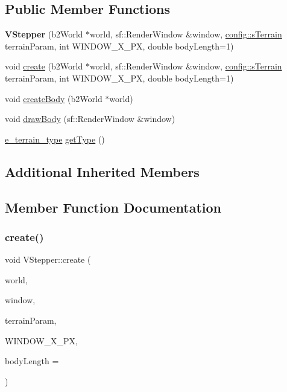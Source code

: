 \subsection*{Public Member Functions}
\begin{DoxyCompactItemize}
\item 
\mbox{\label{class_v_stepper_ab286d507c806c6e9fbac5ca38d47c443}} 
{\bfseries V\+Stepper} (b2\+World $\ast$world, sf\+::\+Render\+Window \&window, \mbox{\hyperlink{structconfig_1_1s_terrain}{config\+::s\+Terrain}} terrain\+Param, int W\+I\+N\+D\+O\+W\+\_\+\+X\+\_\+\+PX, double body\+Length=1)
\item 
void \mbox{\hyperlink{class_v_stepper_adc0daf55fe95e9059576ae432bc4f24c}{create}} (b2\+World $\ast$world, sf\+::\+Render\+Window \&window, \mbox{\hyperlink{structconfig_1_1s_terrain}{config\+::s\+Terrain}} terrain\+Param, int W\+I\+N\+D\+O\+W\+\_\+\+X\+\_\+\+PX, double body\+Length=1)
\item 
void \mbox{\hyperlink{class_v_stepper_a3d7c63308277488473edf5326491d7ee}{create\+Body}} (b2\+World $\ast$world)
\item 
void \mbox{\hyperlink{class_v_stepper_ad81367e4f7422afcd460fd0094a25bc3}{draw\+Body}} (sf\+::\+Render\+Window \&window)
\item 
\mbox{\hyperlink{_terrain_8h_a6d0b7e83bb7325270c1162bece970fd8}{e\+\_\+terrain\+\_\+type}} \mbox{\hyperlink{class_v_stepper_a9621c3cbd705479e32baf9671983cb8b}{get\+Type}} ()
\end{DoxyCompactItemize}
\subsection*{Additional Inherited Members}


\subsection{Member Function Documentation}
\mbox{\label{class_v_stepper_adc0daf55fe95e9059576ae432bc4f24c}} 
\subsubsection{\texorpdfstring{create()}{create()}}
{\footnotesize\ttfamily void V\+Stepper\+::create (\begin{DoxyParamCaption}\item[{b2\+World $\ast$}]{world,  }\item[{sf\+::\+Render\+Window \&}]{window,  }\item[{\mbox{\hyperlink{structconfig_1_1s_terrain}{config\+::s\+Terrain}}}]{terrain\+Param,  }\item[{int}]{W\+I\+N\+D\+O\+W\+\_\+\+X\+\_\+\+PX,  }\item[{double}]{body\+Length = {} }\end{DoxyParamCaption})\hspace{0.3cm}{\ttfamily [virtual]}}

